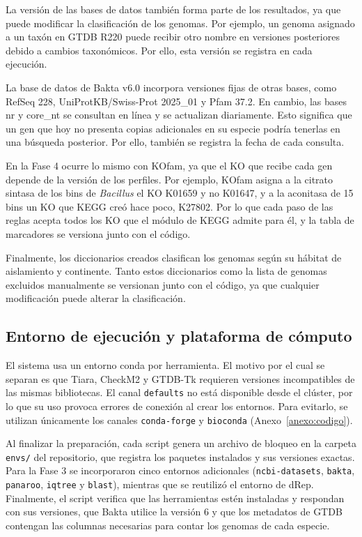 La versión de las bases de datos también forma parte de los resultados, ya que
puede modificar la clasificación de los genomas. Por ejemplo, un genoma asignado
a un taxón en GTDB R220 puede recibir otro nombre en versiones posteriores
debido a cambios taxonómicos. Por ello, esta versión se registra en cada
ejecución.

La base de datos de Bakta v6.0 incorpora versiones fijas de otras bases, como
RefSeq 228, UniProtKB/\allowbreak Swiss-Prot 2025\_01 y Pfam 37.2. En cambio,
las bases nr y core\_nt se consultan en línea y se actualizan diariamente. Esto
significa que un gen que hoy no presenta copias adicionales en su especie podría
tenerlas en una búsqueda posterior. Por ello, también se registra la fecha de
cada consulta.

\begin{nuevo}
En la Fase 4 ocurre lo mismo con KOfam, ya que el KO que recibe cada gen
depende de la versión de los perfiles. Por ejemplo, KOfam asigna a la citrato
sintasa de los bins de \textit{Bacillus} el KO K01659 y no K01647, y a la
aconitasa de 15 bins un KO que KEGG creó hace poco, K27802. Por lo que cada paso
de las reglas acepta todos los KO que el módulo de KEGG admite para él, y la
tabla de marcadores se versiona junto con el código.
\end{nuevo}

Finalmente, los diccionarios creados clasifican los genomas según su hábitat de
aislamiento y continente. Tanto estos diccionarios como la lista de genomas
excluidos manualmente se versionan junto con el código, ya que cualquier
modificación puede alterar la clasificación.

\subsection{Entorno de ejecución y plataforma de cómputo}

El sistema usa un entorno conda por herramienta. El motivo por el cual se
separan es que Tiara, CheckM2 y GTDB-Tk requieren versiones
incompatibles de las mismas bibliotecas. El canal \texttt{defaults} no está
disponible desde el clúster, por lo que su uso provoca errores de conexión al
crear los entornos. Para evitarlo, se utilizan únicamente los canales
\texttt{conda-forge} y \texttt{bioconda} (Anexo~\ref{anexo:codigo}).

Al finalizar la preparación, cada script genera un archivo de bloqueo en la
carpeta \texttt{envs/} del repositorio, que registra los paquetes instalados y sus
versiones exactas. Para la Fase 3 se incorporaron cinco entornos adicionales
(\texttt{ncbi-datasets}, \texttt{bakta}, \texttt{panaroo}, \texttt{iqtree} y
\texttt{blast}), mientras que se reutilizó el entorno de dRep. Finalmente, el
script verifica que las herramientas estén instaladas y respondan con sus
versiones, que Bakta utilice la versión 6 y que los metadatos de GTDB contengan
las columnas necesarias para contar los genomas de cada especie.

